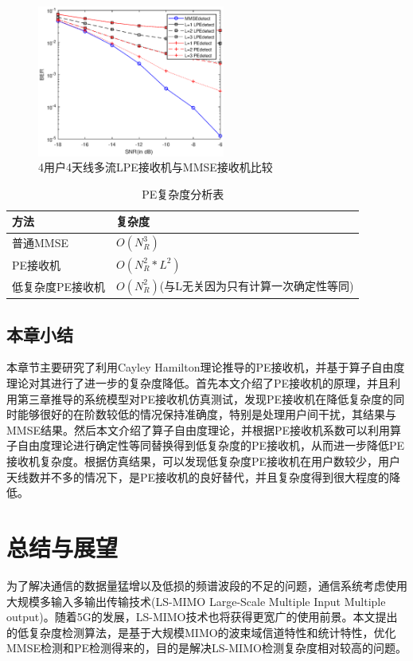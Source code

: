 \documentclass[bachelor,nocolorlinks, printoneside]{seuthesis} %
\begin{document}
\begin{Main}
\begin{figure}[htbp!]
\end{figure}
\begin{figure}[htbp!]
	\centering \includegraphics[width=0.55\textwidth]{img/4_11.eps} \caption{4用户4天线多流LPE接收机与MMSE接收机比较}
\end{figure}

\begin{table}[htbp]
	\centering
	\caption{\label{tab:complexity2}PE复杂度分析表}
	\begin{tabular}{ll}
		\toprule
		方法 & 复杂度 \\
		\bottomrule
		普通MMSE & $O(N_R^3)$ \\
		PE接收机 & $O(N_R^2*L^2)$ \\
		低复杂度PE接收机 & $O(N_R^2)$(与L无关因为只有计算一次确定性等同)\\
		\bottomrule
	\end{tabular}
\end{table}

\section{本章小结}
本章节主要研究了利用Cayley Hamilton理论推导的PE接收机，并基于算子自由度理论对其进行了进一步的复杂度降低。首先本文介绍了PE接收机的原理，并且利用第三章推导的系统模型对PE接收机仿真测试，发现PE接收机在降低复杂度的同时能够很好的在阶数较低的情况保持准确度，特别是处理用户间干扰，其结果与MMSE结果。然后本文介绍了算子自由度理论，并根据PE接收机系数可以利用算子自由度理论进行确定性等同替换得到低复杂度的PE接收机，从而进一步降低PE接收机复杂度。根据仿真结果，可以发现低复杂度PE接收机在用户数较少，用户天线数并不多的情况下，是PE接收机的良好替代，并且复杂度得到很大程度的降低。

\chapter{总结与展望}
为了解决通信的数据量猛增以及低损的频谱波段的不足的问题，通信系统考虑使用大规模多输入多输出传输技术(LS-MIMO Large-Scale Multiple Input Multiple output)。随着5G的发展，LS-MIMO技术也将获得更宽广的使用前景。本文提出的低复杂度检测算法，是基于大规模MIMO的波束域信道特性和统计特性，优化MMSE检测和PE检测得来的，目的是解决LS-MIMO检测复杂度相对较高的问题。

\end{Main}
\end{document}
